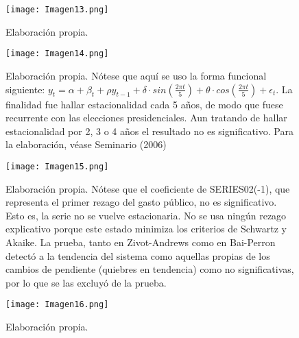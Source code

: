 \documentclass[12pt]{article}
\begin{document}
\begin{figure}[H]
\par\vspace{0.8em}
\texttt{[image: Imagen13.png]}

{\footnotesize Elaboración propia.}

\end{figure}
\begin{figure}[H]
\par\vspace{0.8em}
\texttt{[image: Imagen14.png]}

{\footnotesize Elaboración propia. Nótese que aquí se uso la forma funcional siguiente: 
$y_t=α+β_t+ρy_{t-1}+δ⋅sin(\frac{2πt}{5})+θ⋅cos(\frac{2πt}{5})+\epsilon_t$. La finalidad fue hallar estacionalidad cada 5 años, de modo que fuese recurrente con las elecciones presidenciales. Aun tratando de hallar estacionalidad por 2, 3 o 4 años el resultado no es significativo. Para la elaboración, véase Seminario (2006) 
}
\end{figure}

\begin{figure}[H]
\par\vspace{0.8em}
\texttt{[image: Imagen15.png]}

{\footnotesize Elaboración propia. Nótese que el coeficiente de SERIES02(-1), que representa el primer rezago del gasto público, no es significativo. Esto es, la serie no se vuelve estacionaria. No se usa ningún rezago explicativo porque este estado minimiza los criterios de Schwartz y Akaike. La prueba, tanto en Zivot-Andrews como en Bai-Perron detectó a la tendencia del sistema como aquellas propias de los cambios de pendiente (quiebres en tendencia) como no significativas, por lo que se las excluyó de la prueba. }
\end{figure}

\begin{figure}[H]
\par\vspace{0.8em}
\texttt{[image: Imagen16.png]}

{\footnotesize Elaboración propia.}
\end{figure}
\end{document}
